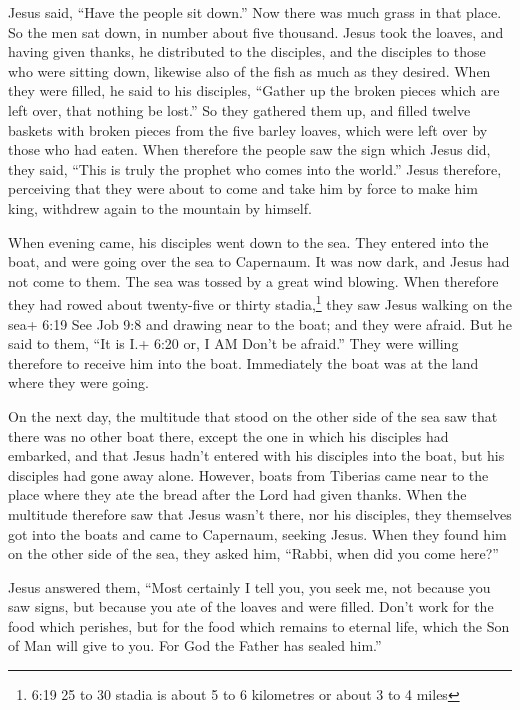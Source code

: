  Jesus said, ``Have the people sit down.'' Now there was
much grass in that place. So the men sat down, in number about five
thousand.  Jesus took the loaves, and having given thanks,
he distributed to the disciples, and the disciples to those who were
sitting down, likewise also of the fish as much as they desired.
 When they were filled, he said to his disciples, ``Gather
up the broken pieces which are left over, that nothing be lost.''
 So they gathered them up, and filled twelve baskets with
broken pieces from the five barley loaves, which were left over by those
who had eaten.  When therefore the people saw the sign
which Jesus did, they said, ``This is truly the prophet who comes into
the world.''  Jesus therefore, perceiving that they were
about to come and take him by force to make him king, withdrew again to
the mountain by himself.

 When evening came, his disciples went down to the sea.
 They entered into the boat, and were going over the sea to
Capernaum. It was now dark, and Jesus had not come to them.
 The sea was tossed by a great wind blowing. 
When therefore they had rowed about twenty-five or thirty
stadia,\footnote{6:19 25 to 30 stadia is about 5 to 6 kilometres or
  about 3 to 4 miles} they saw Jesus walking on the sea+ 6:19 See Job
9:8 and drawing near to the boat; and they were afraid. 
But he said to them, ``It is I.+ 6:20 or, I AM Don't be afraid.''
 They were willing therefore to receive him into the boat.
Immediately the boat was at the land where they were going.

 On the next day, the multitude that stood on the other
side of the sea saw that there was no other boat there, except the one
in which his disciples had embarked, and that Jesus hadn't entered with
his disciples into the boat, but his disciples had gone away alone.
 However, boats from Tiberias came near to the place where
they ate the bread after the Lord had given thanks.  When
the multitude therefore saw that Jesus wasn't there, nor his disciples,
they themselves got into the boats and came to Capernaum, seeking Jesus.
 When they found him on the other side of the sea, they
asked him, ``Rabbi, when did you come here?''

 Jesus answered them, ``Most certainly I tell you, you seek
me, not because you saw signs, but because you ate of the loaves and
were filled.  Don't work for the food which perishes, but
for the food which remains to eternal life, which the Son of Man will
give to you. For God the Father has sealed him.''

